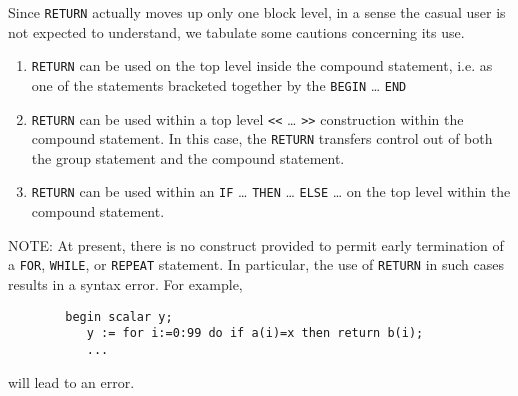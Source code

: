 Since \texttt{RETURN} actually moves up only one
block level, in a sense the casual user is not expected to
understand, we tabulate some cautions concerning its use.
\begin{enumerate}
\item \texttt{RETURN} can be used on the top level inside the compound
statement, i.e. as one of the statements bracketed together by the 
\texttt{BEGIN} \ldots{} \texttt{END}

\item \texttt{RETURN} can be used within a top level \texttt{<}\texttt{<}
  \ldots{} \texttt{>}\texttt{>} construction within the compound statement. In
  this case, the \texttt{RETURN} transfers control out of both the
  group statement and the compound statement.

\item \texttt{RETURN} can be used within an \texttt{IF} \ldots{}
  \texttt{THEN} \ldots{} \texttt{ELSE} \ldots{} on the top level within
  the compound statement.
\end{enumerate}
NOTE:  At present, there is no construct provided to permit early
termination of a \texttt{FOR}, \texttt{WHILE},
or \texttt{REPEAT} statement.  In particular, the use of
\texttt{RETURN} in such cases results in a syntax error.  For example,
\begin{verbatim}
        begin scalar y;
           y := for i:=0:99 do if a(i)=x then return b(i);
           ...
\end{verbatim}
will lead to an error.

